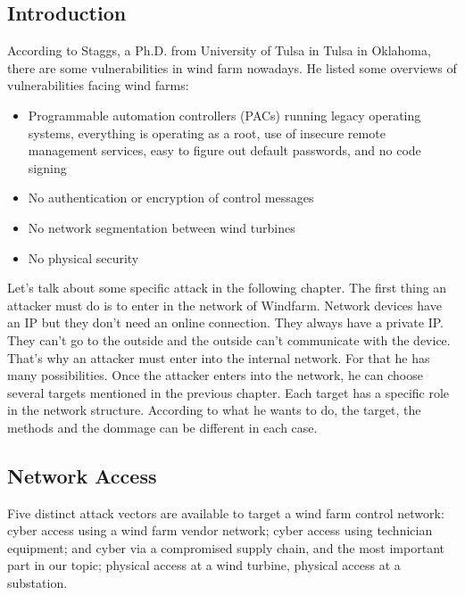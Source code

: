 \documentclass[twosided,a4,10pt]{article}
\begin{document}
\begin{multicols}{2}
\subsection{Introduction}
 According to Staggs, a Ph.D. from University of Tulsa in Tulsa in Oklahoma, there are some vulnerabilities in wind farm nowadays. He listed some overviews of vulnerabilities facing wind farms:
 \begin{itemize}
     \item Programmable automation controllers (PACs) running legacy operating systems, everything is operating as a root, use of insecure remote management services, easy to figure out default passwords, and no code signing
    \item	No authentication or encryption of control messages
    \item	No network segmentation between wind turbines
    \item	No physical security
 \end{itemize}
 Let's talk about some specific attack in the following chapter. The first thing an attacker must do is to enter in the network of Windfarm. Network devices have an IP but they don't need an online connection. They always have a private IP. They can't go to the outside and the outside can't communicate with the device. That's why an attacker must enter into the internal network. For that he has many possibilities. Once the attacker enters into the network, he can choose several targets mentioned in the previous chapter. Each target has a specific role in the network structure. According to what he wants to do, the target, the methods and the dommage can be different in each case.
 
 
\subsection{Network Access}
Five distinct attack vectors are available to target a wind farm control network: cyber access using a wind farm vendor network; cyber access using technician equipment; and cyber via a compromised supply chain, and the most important part in our topic; physical access at a wind turbine, physical access at a substation.

\end{multicols}
\end{document}
